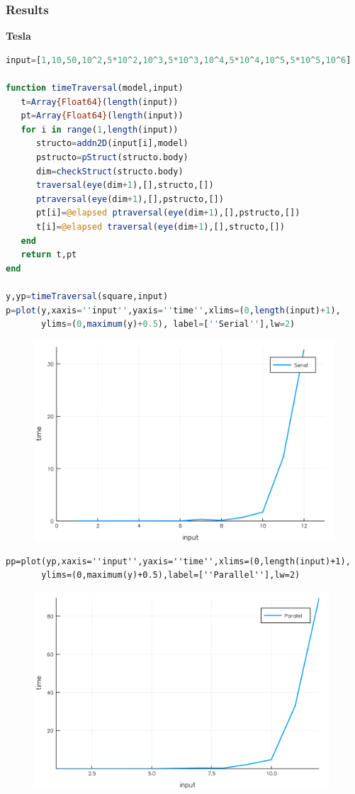 \documentclass[a4paper,12pt]{article}
\begin{document}
\subsubsection{Results}
\textbf{Tesla}
\begin{lstlisting}[language=Julia]
input=[1,10,50,10^2,5*10^2,10^3,5*10^3,10^4,5*10^4,10^5,5*10^5,10^6]
	    
function timeTraversal(model,input)
   t=Array{Float64}(length(input))
   pt=Array{Float64}(length(input))
   for i in range(1,length(input))
      structo=addn2D(input[i],model)
      pstructo=pStruct(structo.body)
      dim=checkStruct(structo.body)
      traversal(eye(dim+1),[],structo,[])
      ptraversal(eye(dim+1),[],pstructo,[])
      pt[i]=@elapsed ptraversal(eye(dim+1),[],pstructo,[])
      t[i]=@elapsed traversal(eye(dim+1),[],structo,[])
   end
   return t,pt
end

y,yp=timeTraversal(square,input)
p=plot(y,xaxis=''input'',yaxis=''time'',xlims=(0,length(input)+1),
       ylims=(0,maximum(y)+0.5), label=[''Serial''],lw=2)
\end{lstlisting}
\begin{figure}[ht!]
\includegraphics[width=13cm,scale=0.3]{traversal.png}
\end{figure}
\newpage
\begin{verbatim}
pp=plot(yp,xaxis=''input'',yaxis=''time'',xlims=(0,length(input)+1),
       ylims=(0,maximum(y)+0.5),label=[''Parallel''],lw=2)
\end{verbatim}
\begin{figure}[ht!]
\centering
\includegraphics[width=11cm,scale=0.3]{ptraversal.png}
\end{figure}
\end{document}

